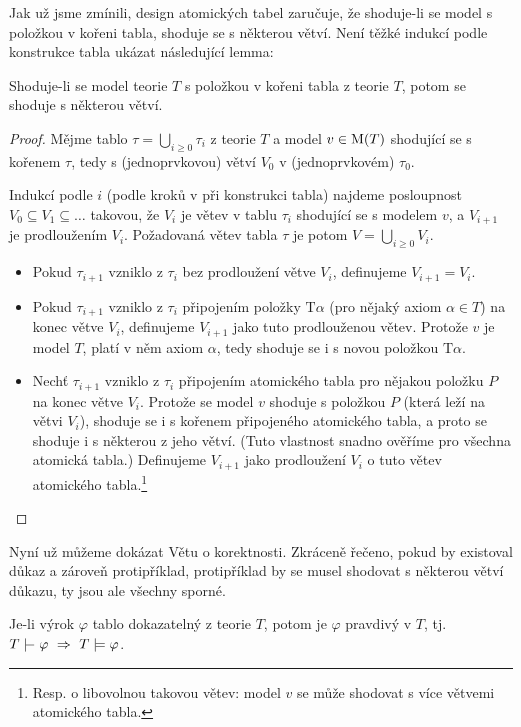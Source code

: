 Jak už jsme zmínili, design atomických tabel zaručuje, že shoduje-li se model s položkou v kořeni tabla, shoduje se s některou větví. Není těžké indukcí podle konstrukce tabla ukázat následující lemma:
\begin{lemma}\label{lemma:agrees-with-branch}
    Shoduje-li se model teorie $T$ s položkou v kořeni tabla z teorie $T$, potom se shoduje s některou větví.
\end{lemma}
\begin{proof}
    Mějme tablo $\tau=\bigcup_{i\geq 0}\tau_i$ z teorie $T$ a model $v\in\operatorname{M}(T)$ shodující se s kořenem $\tau$, tedy s (jednoprvkovou) větví $V_0$ v (jednoprvkovém) $\tau_0$.
    
    Indukcí podle $i$ (podle kroků v při konstrukci tabla) najdeme posloupnost $V_0\subseteq V_1\subseteq\dots$ takovou, že $V_i$ je větev v tablu $\tau_i$ shodující se s modelem $v$, a $V_{i+1}$ je prodloužením $V_i$. Požadovaná větev tabla $\tau$ je potom $V=\bigcup_{i\geq 0}V_i$.
    
    \begin{itemize}
        \item Pokud $\tau_{i+1}$ vzniklo z $\tau_i$ bez prodloužení větve $V_i$, definujeme $V_{i+1}=V_i$.
        \item Pokud $\tau_{i+1}$ vzniklo z $\tau_i$ připojením položky $\mathrm{T}\alpha$ (pro nějaký axiom $\alpha\in T$) na konec větve  $V_i$, definujeme $V_{i+1}$ jako tuto prodlouženou větev. Protože $v$ je model $T$, platí v něm axiom $\alpha$, tedy shoduje se i s novou položkou $\mathrm{T}\alpha$.
        \item Nechť $\tau_{i+1}$ vzniklo z $\tau_i$ připojením atomického tabla pro nějakou položku $P$ na konec větve $V_i$. Protože se model $v$ shoduje s položkou $P$ (která leží na větvi $V_i$), shoduje se i s kořenem připojeného atomického tabla, a proto se shoduje i s některou z jeho větví. (Tuto vlastnost snadno ověříme pro všechna atomická tabla.) Definujeme $V_{i+1}$ jako prodloužení $V_i$ o tuto větev atomického tabla.\footnote{Resp. o libovolnou takovou větev: model $v$ se může shodovat s více větvemi atomického tabla.}
    \end{itemize}
\end{proof}

Nyní už můžeme dokázat Větu o korektnosti. Zkráceně řečeno, pokud by existoval důkaz a zároveň protipříklad, protipříklad by se musel shodovat s některou větví důkazu, ty jsou ale všechny sporné.

\begin{theorem}[O korektnosti]
Je-li výrok $\varphi$ tablo dokazatelný z teorie $T$, potom je $\varphi$ pravdivý v $T$, tj. $T\proves\varphi\ \Rightarrow\ T\models\varphi$.    
\end{theorem}

